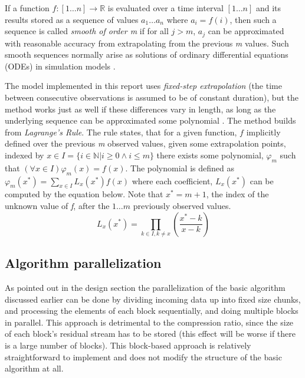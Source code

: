   If a function $f:[1\dots n] \rightarrow \mathbb{R}$ is evaluated over a time interval $[1\dots n]$ and its results stored as a sequence of values 
  $a_{1}\dots a_{n}$ where $a_{i} = f(i)$, then such a sequence is called \textit{smooth of order m} if for all $j>m$, $a_{j}$ can be approximated with reasonable
  accuracy from extrapolating from the previous \textit{m} values. Such smooth sequences normally arise as solutions of ordinary differential equations (ODEs) in
  simulation models \cite{engelson2000lossless}.
  
  The model implemented in this report uses \textit{fixed-step extrapolation} (the time between consecutive observations is assumed to be of constant duration), but
  the method works just as well if these differences vary in length, as long as the underlying sequence can be approximated some polynomial \cite{engelson2000lossless}. 
  The method builds from \textit{Lagrange's Rule}. The rule states, that for a given function, $f$ implicitly defined over the previous \textit{m} 
  observed values, given some extrapolation points, indexed by $x\in I = \{i\in\mathbb{N}|i\geq 0\wedge i\leq m\}$ there exists some polynomial, $\varphi_{m}$ such that 
  $(\forall x\in I) \varphi_{m}(x)=f(x)$. The polynomial is defined as $\varphi_{m}(x^{*})=\sum_{x\in I}L_{x}(x^{*})f(x)$ where each coefficient, $L_{x}(x^{*})$ 
  can be computed by the equation below. Note that $x^{*} = m + 1$, the index of the unknown value of \textit{f}, after the $1\dots m$ previously observed values.
  \begin{equation}
   L_{x}(x^{*}) = \prod_{k\in{I},k\neq x}\left(\frac{x^{*}-k}{x-k}\right)
  \end{equation}

 \subsection{Algorithm parallelization}
  As pointed out in the design section the parallelization of the basic algorithm discussed earlier can be done by dividing incoming data up into fixed size chunks, and
  processing the elements of each block sequentially, and doing multiple blocks in parallel. This approach is detrimental to the compression ratio, since the size of each
  block's residual stream has to be stored (this effect will be worse if there is a large number of blocks). This block-based approach is relatively straightforward to 
  implement and does not modify the structure of the basic algorithm at all.
  

